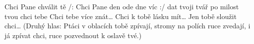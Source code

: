 \begin{TEXT}{Chci Pane chválit tě}
\REFREN    /: Chci Pane  den ode dne víc :/ \NL
{}dat tvoji tvář po milost tvou \NL
chci tebe  
\SLOKA Chci tebe více znát… 
\SLOKA Chci     k tobě lásku mít… 
\SLOKA Jen tobě sloužit chci…
\INTERM (Druhý hlas: Ptáci v oblacích tobě zpívají, \NL
stromy na polích ruce zvedají, \NL
i já zpívat chci, ruce pozvednout k oslavě tvé.) \NL
\end{TEXT}
